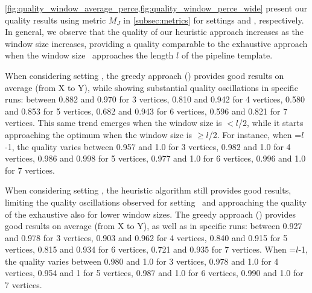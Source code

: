 \cref{fig:quality_window_average_perce,fig:quality_window_perce_wide} present our quality results using metric $M_J$ in \cref{subsec:metrics} for settings \wide and \average, respectively.
In general, we observe that the quality of our heuristic approach increases as the window size increases, providing a quality comparable to the exhaustive approach when the window size \windowsize\ approaches the length $l$ of the pipeline template.

When considering setting \wide, the greedy approach () provides good results on average (from X to Y), while showing substantial quality oscillations in specific runs: between 0.882 and 0.970 for 3 vertices, 0.810 and 0.942 for 4 vertices, 0.580 and 0.853 for 5 vertices, 0.682 and 0.943 for 6 vertices, 0.596 and 0.821 for 7 vertices. This same trend emerges when the window size is $<$$l$/2, while it starts approaching the optimum when the window size is $\geq$$l$/2. For instance, when \windowsize=$l$-1, the quality varies between 0.957 and 1.0 for 3 vertices, 0.982 and 1.0 for 4 vertices, 0.986 and 0.998 for 5 vertices, 0.977 and 1.0 for 6 vertices, 0.996 and 1.0 for 7 vertices.

When considering setting \average, the heuristic algorithm still provides good results, limiting the quality oscillations observed for setting \wide\ and approaching the quality of the exhaustive also for lower window sizes. The greedy approach () provides good results on average (from X to Y), as well as in specific runs: between 0.927 and 0.978 for 3 vertices, 0.903 and 0.962 for 4 vertices, 0.840 and 0.915 for 5 vertices, 0.815 and 0.934 for 6 vertices, 0.721 and 0.935 for 7 vertices.
When \windowsize=$l$-1, the quality varies between 0.980 and 1.0 for 3 vertices, 0.978 and 1.0 for 4 vertices, 0.954 and 1 for 5 vertices, 0.987 and 1.0 for 6 vertices, 0.990 and 1.0 for 7 vertices.

